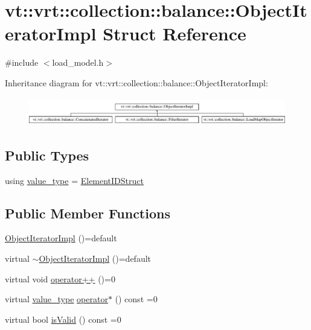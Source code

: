 \hypertarget{structvt_1_1vrt_1_1collection_1_1balance_1_1_object_iterator_impl}{}\section{vt\+:\+:vrt\+:\+:collection\+:\+:balance\+:\+:Object\+Iterator\+Impl Struct Reference}
\label{structvt_1_1vrt_1_1collection_1_1balance_1_1_object_iterator_impl}


{\ttfamily \#include $<$load\+\_\+model.\+h$>$}

Inheritance diagram for vt\+:\+:vrt\+:\+:collection\+:\+:balance\+:\+:Object\+Iterator\+Impl\+:\begin{figure}[H]
\begin{center}
\leavevmode
\includegraphics[height=1.252796cm]{structvt_1_1vrt_1_1collection_1_1balance_1_1_object_iterator_impl}
\end{center}
\end{figure}
\subsection*{Public Types}
\begin{DoxyCompactItemize}
\item 
using \hyperlink{structvt_1_1vrt_1_1collection_1_1balance_1_1_object_iterator_impl_a8a38ab2c722e341d729f61cb59112376}{value\+\_\+type} = \hyperlink{structvt_1_1vrt_1_1collection_1_1balance_1_1_element_i_d_struct}{Element\+I\+D\+Struct}
\end{DoxyCompactItemize}
\subsection*{Public Member Functions}
\begin{DoxyCompactItemize}
\item 
\hyperlink{structvt_1_1vrt_1_1collection_1_1balance_1_1_object_iterator_impl_a808e1d2a3427a4c9ed86ecafc28edd41}{Object\+Iterator\+Impl} ()=default
\item 
virtual \hyperlink{structvt_1_1vrt_1_1collection_1_1balance_1_1_object_iterator_impl_ab71847f88423abc159bf0d53ace9474b}{$\sim$\+Object\+Iterator\+Impl} ()=default
\item 
virtual void \hyperlink{structvt_1_1vrt_1_1collection_1_1balance_1_1_object_iterator_impl_ab59b65c6a22626b6d2d3ab283309ac1f}{operator++} ()=0
\item 
virtual \hyperlink{structvt_1_1vrt_1_1collection_1_1balance_1_1_object_iterator_impl_a8a38ab2c722e341d729f61cb59112376}{value\+\_\+type} \hyperlink{structvt_1_1vrt_1_1collection_1_1balance_1_1_object_iterator_impl_a361451a08b7d2361ee9f0e5b3c35c089}{operator$\ast$} () const =0
\item 
virtual bool \hyperlink{structvt_1_1vrt_1_1collection_1_1balance_1_1_object_iterator_impl_a16b8504d1abff325f65ce29513792386}{is\+Valid} () const =0
\end{DoxyCompactItemize}


